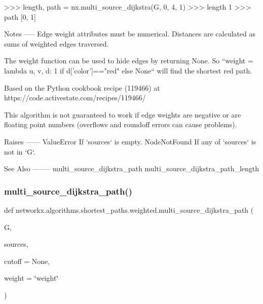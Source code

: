 \begin{DoxyVerb}
>>> length, path = nx.multi_source_dijkstra(G, {0, 4}, 1)
>>> length
1
>>> path
[0, 1]

Notes
-----
Edge weight attributes must be numerical.
Distances are calculated as sums of weighted edges traversed.

The weight function can be used to hide edges by returning None.
So ``weight = lambda u, v, d: 1 if d['color']=="red" else None``
will find the shortest red path.

Based on the Python cookbook recipe (119466) at
https://code.activestate.com/recipes/119466/

This algorithm is not guaranteed to work if edge weights
are negative or are floating point numbers
(overflows and roundoff errors can cause problems).

Raises
------
ValueError
    If `sources` is empty.
NodeNotFound
    If any of `sources` is not in `G`.

See Also
--------
multi_source_dijkstra_path
multi_source_dijkstra_path_length\end{DoxyVerb}
 \mbox{\label{namespacenetworkx_1_1algorithms_1_1shortest__paths_1_1weighted_a486bcb57503a86eea5888b1ce4ba8a3d}} 
\subsubsection{\texorpdfstring{multi\+\_\+source\+\_\+dijkstra\+\_\+path()}{multi\_source\_dijkstra\_path()}}
{\footnotesize\ttfamily def networkx.\+algorithms.\+shortest\+\_\+paths.\+weighted.\+multi\+\_\+source\+\_\+dijkstra\+\_\+path (\begin{DoxyParamCaption}\item[{}]{G,  }\item[{}]{sources,  }\item[{}]{cutoff = {\ttfamily None},  }\item[{}]{weight = {\ttfamily \char`\"{}weight\char`\"{}} }\end{DoxyParamCaption})}

